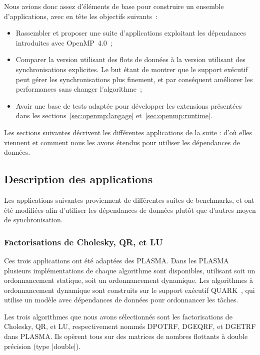 Nous avions donc assez d'éléments de base pour construire un ensemble d'applications, avec en tête les objectifs suivants~:
\begin{itemize}
  \item Rassembler et proposer une suite d'applications exploitant les dépendances introduites avec OpenMP~4.0~;
  \item Comparer la version utilisant des flots de données à la version utilisant des synchronisations explicites. Le but étant de montrer que le support exécutif peut gérer les synchronisations plus finement, et par conséquent améliorer les performances sans changer l'algorithme~;
  \item Avoir une base de tests adaptée pour développer les extensions présentées dans les sections~\ref{sec:openmp:langage} et~\ref{sec:openmp:runtime}.
\end{itemize}

Les sections suivantes décrivent les différentes applications de la suite : d'où elles viennent et comment nous les avons étendus pour utiliser les dépendances de données.


\subsection{Description des applications}

Les applications suivantes proviennent de différentes suites de benchmarks, et ont été modifiées afin d'utiliser les dépendances de données plutôt que d'autres moyen de synchronisation.

\subsubsection{Factorisations de Cholesky, QR, et LU}

Ces trois applications ont été adaptées des PLASMA.
Dans les PLASMA plusieurs implémentations de chaque algorithme sont disponibles, utilisant soit un ordonnancement statique, soit un ordonnancement dynamique.
Les algorithmes à ordonnancement dynamique sont construits sur le support exécutif QUARK~\cite{YarKhan2011}, qui utilise un modèle avec dépendances de données pour ordonnancer les tâches.

Les trois algorithmes que nous avons sélectionnés sont les factorisations de Cholesky, QR, et LU, respectivement nommés DPOTRF, DGEQRF, et DGETRF dans PLASMA.
Ils opèrent tous sur des matrices de nombres flottants à double précision (type |double|).


